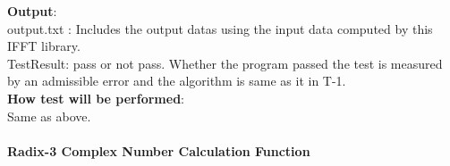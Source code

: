 \documentclass[12pt, titlepage]{article}
\begin{document}
\begin{enumerate}
\textbf {Output}: \\{\large output.txt} : Includes the output datas using the input data computed by this IFFT library.\\
{\large TestResult}: pass or not pass. Whether the program passed the test is measured by an admissible error and the algorithm is same as it in T-1.\\
					

\textbf {How test will be performed}: \\
Same as above.
\end{enumerate}

\paragraph{Radix-3 Complex Number Calculation Function\\}
\end{document}
